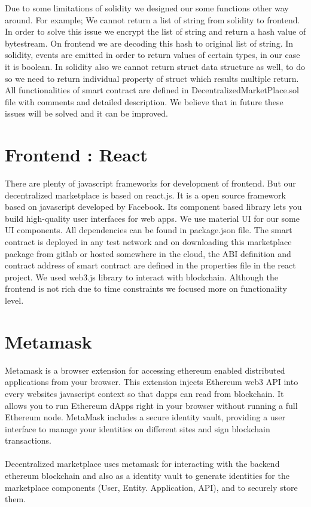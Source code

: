 Due to some limitations of solidity we designed our some functions other way around. For example; We cannot return a list of string from solidity to frontend. In order to solve this issue we encrypt the list of string and return a hash value of bytestream. On frontend we are decoding this hash to original list of string. In solidity, events are emitted in order to return values of certain types, in our case it is boolean. In solidity also we cannot return struct data structure as well, to do so we need to return individual property of struct which results multiple return. All functionalities of smart contract are defined in DecentralizedMarketPlace.sol file with comments and detailed description. We believe that in future these issues will be solved and it can be improved.

\section{Frontend : React}
There are plenty of javascript frameworks for development of frontend. But our decentralized marketplace is based on react.js. It is a open source framework based on javascript developed by Facebook. Its component based library lets you build high-quality user interfaces for web apps. We use material UI for our some UI components. All dependencies can be found in package.json file. The smart contract is deployed in any test network and on downloading this marketplace package from gitlab or hosted somewhere in the cloud, the ABI definition and contract address of smart contract are defined in the properties file in the react project. We used web3.js library to interact with blockchain. Although the frontend is not rich due to time constraints we focused more on functionality level.
\section{Metamask}
Metamask is a browser extension for accessing ethereum enabled distributed applications from your browser. This extension injects Ethereum web3 API into every websites javascript context so that dapps can read from blockchain. It allows you to run Ethereum dApps right in your browser without running a full Ethereum node. MetaMask includes a secure identity vault, providing a user interface to manage your identities on different sites and sign blockchain transactions. \cite{Metamask}
\\
\\
Decentralized marketplace uses metamask for interacting with the backend ethereum blockchain and also as a identity vault to generate identities for the marketplace components (User, Entity. Application, API), and to securely store them.
